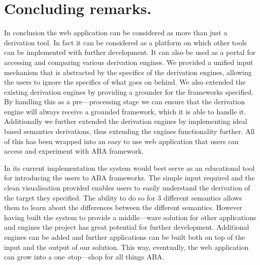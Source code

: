 \section{Concluding remarks.}
In conclusion the web application can be considered as more than just a derivation tool. In fact it can be considered as a platform on which other tools can be implemented with further development. It can also be used as a portal for accessing and comparing various derivation engines. We provided a unified input mechanism that is abstracted by the specifics of the derivation engines, allowing the users to ignore the specifics of what goes on behind. We also extended the existing derivation engines by providing a grounder for the frameworks specified. By handling this as a pre---processing stage we can ensure that the derivation engine will always receive a grounded framework, which it is able to handle it. Additionally we further extended the derivation engines by implementing ideal based semantics derivations, thus extending the engines functionality further. All of this has been wrapped into an easy to use web application that users can access and experiment with ABA framework.

In its current implementation the system would best serve as an educational tool for introducing the users to ABA frameworks. The simple input required and the clean visualisation provided enables users to easily understand the derivation of the target they specified. The ability to do so for 3 different semantics allows them to learn about the differences between the different semantics. However having built the system to provide a middle---ware solution for other applications and engines the project has great potential for further development. Additional engines can be added and further applications can be built both on top of the input and the output of our solution. This way, eventually, the web application can grow into a one--stop---shop for all things ABA.
